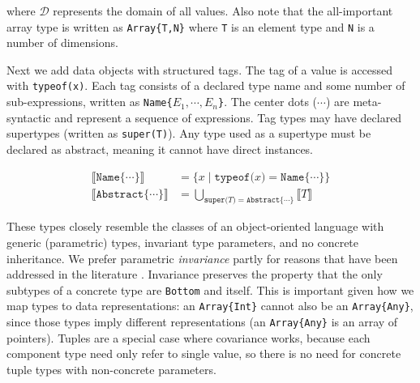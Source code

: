 \noindent
where $\mathcal{D}$ represents the domain of all values.
Also note that the all-important array type is written as \texttt{Array\{T,N\}} where
\texttt{T} is an element type and \texttt{N} is a number of dimensions.

Next we add data objects with structured tags.
The tag of a value is accessed with \texttt{typeof(x)}.
Each tag consists of a declared type name and some number of sub-expressions,
written as \texttt{Name\{}$E_1, \cdots, E_n$\texttt{\}}.
The center dots ($\cdots$) are meta-syntactic and represent a sequence of expressions.
Tag types may have declared supertypes (written as \texttt{super(T)}).
Any type used as a supertype must be declared as abstract, meaning it
cannot have direct instances.

\vspace{-3ex}
\begin{align*}
  \llbracket \texttt{Name\{}\cdots\texttt{\}} \rrbracket &= \{ x\mid \texttt{typeof(}x\texttt{)} = \texttt{Name\{}\cdots\texttt{\}} \} \\
  \llbracket \texttt{Abstract\{}\cdots\texttt{\}} \rrbracket &= \bigcup_{\texttt{super(}T\texttt{)} = \texttt{Abstract\{}\cdots\texttt{\}}} \llbracket T \rrbracket
\end{align*}

These types closely resemble the classes of an object-oriented language with
generic (parametric) types, invariant type parameters, and no concrete inheritance.
We prefer parametric \emph{invariance} partly for reasons that have been addressed in the
literature \cite{Day:1995:SVC:217838.217852}.
Invariance preserves the property that the only subtypes of a concrete type are \texttt{Bottom}
and itself.
This is important given how we map types to data representations: an \texttt{Array\{Int\}}
cannot also be an \texttt{Array\{Any\}}, since those types imply different
representations (an \texttt{Array\{Any\}} is an array of pointers).
Tuples are a special case where covariance works, because each component type need
only refer to single value, so there is no need for concrete
tuple types with non-concrete parameters.

